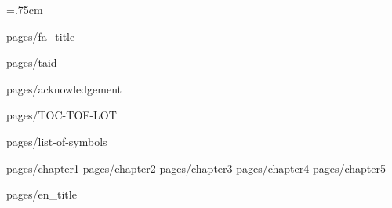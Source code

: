 \documentclass[
			   oneside,
			   msc,
			   12pt
			   ]{AUTthesis}
\begin{document}
	\baselineskip=.75cm
	\linespread{1.75}

	 {pages/fa_title}
	
	 {pages/taid}
	
	 {pages/acknowledgement}
	
	
	 {pages/TOC-TOF-LOT}
	
	 {pages/list-of-symbols}
	
	\pagestyle{style1}
	
	 {pages/chapter1}
	 {pages/chapter2}
	 {pages/chapter3}
	 {pages/chapter4}
	 {pages/chapter5}
	

	\chapterfont{\vspace*{-2em}\centering\LARGE}%
	
	\appendix
	
	
	

	\parindent=0pt
	

	\pagestyle{style7}
	\printindex
	\pagestyle{style7}
	
	 {pages/en_title}
	
\end{document}
